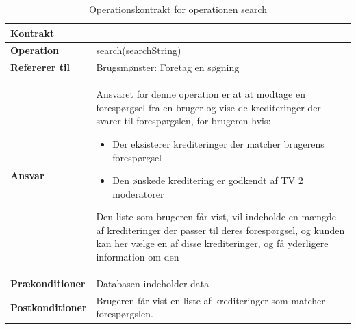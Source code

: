 \begin{table}[H]
\centering
\label{tab:2}
    \begin{tabular}{|p{35mm}|p{115mm}|} \hline
        \textbf{Kontrakt} &  \\ \hline
        \textbf{Operation} & search(searchString) \\ \hline
        \textbf{Refererer til} & Brugsmønster: Foretag en søgning \\ \hline
        \textbf{Ansvar} & Ansvaret for denne operation er at at modtage en
        forespørgsel fra en bruger og vise de krediteringer der svarer til
        forespørgslen, for brugeren hvis:
        \begin{itemize}
            \item Der eksisterer krediteringer der matcher brugerens forespørgsel
            \item Den ønskede kreditering er godkendt af TV 2 moderatorer 
        \end{itemize}
        Den liste som brugeren får vist, vil indeholde en mængde af
        krediteringer der passer til deres forespørgsel, og kunden kan her vælge
        en af disse krediteringer, og få yderligere information om den\\ \hline
        \textbf{Prækonditioner} & Databasen indeholder data\\ \hline
        \textbf{Postkonditioner} &
        Brugeren får vist en liste af krediteringer som matcher forespørgslen.\\
        \hline
    \end{tabular}
        \caption{Operationskontrakt for operationen search}
        \label{tab:OperationsKontraktB03}
\end{table}

